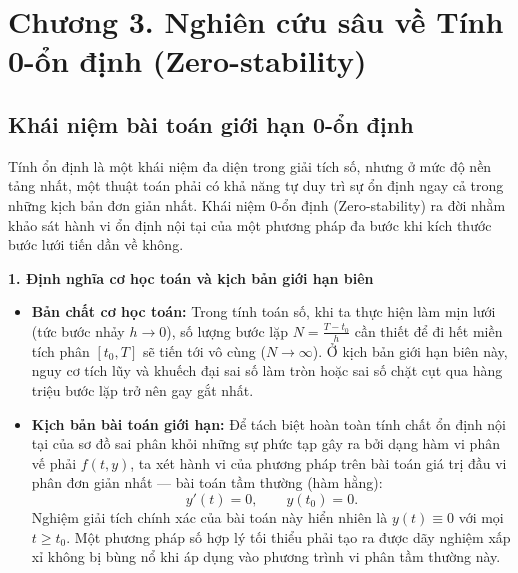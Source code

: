 \section{Chương 3. Nghiên cứu sâu về Tính 0-ổn định (Zero-stability)}

\subsection{Khái niệm bài toán giới hạn 0-ổn định}

Tính ổn định là một khái niệm đa diện trong giải tích số, nhưng ở mức độ nền tảng nhất, một thuật toán phải có khả năng tự duy trì sự ổn định ngay cả trong những kịch bản đơn giản nhất. Khái niệm 0-ổn định (Zero-stability) ra đời nhằm khảo sát hành vi ổn định nội tại của một phương pháp đa bước khi kích thước bước lưới tiến dần về không.

\vspace{0.5em}
\noindent \textbf{1. Định nghĩa cơ học toán và kịch bản giới hạn biên}
\begin{itemize}
    \item \textbf{Bản chất cơ học toán:} Trong tính toán số, khi ta thực hiện làm mịn lưới (tức bước nhảy $h \to 0$), số lượng bước lặp $N = \frac{T - t_0}{h}$ cần thiết để đi hết miền tích phân $[t_0, T]$ sẽ tiến tới vô cùng ($N \to \infty$). Ở kịch bản giới hạn biên này, nguy cơ tích lũy và khuếch đại sai số làm tròn hoặc sai số chặt cụt qua hàng triệu bước lặp trở nên gay gắt nhất.
    \item \textbf{Kịch bản bài toán giới hạn:} Để tách biệt hoàn toàn tính chất ổn định nội tại của sơ đồ sai phân khỏi những sự phức tạp gây ra bởi dạng hàm vi phân vế phải $f(t, y)$, ta xét hành vi của phương pháp trên bài toán giá trị đầu vi phân đơn giản nhất — bài toán tầm thường (hàm hằng):
    \begin{equation}
        y'(t) = 0, \qquad y(t_0) = 0. \tag{3.1}
    \end{equation}
    Nghiệm giải tích chính xác của bài toán này hiển nhiên là $y(t) \equiv 0$ với mọi $t \ge t_0$. Một phương pháp số hợp lý tối thiểu phải tạo ra được dãy nghiệm xấp xỉ không bị bùng nổ khi áp dụng vào phương trình vi phân tầm thường này.
\end{itemize}

